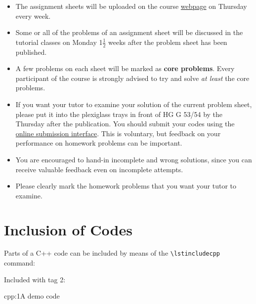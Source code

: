 \documentclass[12pt]{report}
\begin{document}
\begin{itemize}
\item The assignment sheets will be uploaded on the course
  \href{http://www2.math.ethz.ch/education/bachelor/lectures/hs2015/math/nummath_cse/index}{webpage}
  on Thursday every week.
\item Some or all of the problems of an assignment sheet will be discussed in the
  tutorial classes on Monday 1$\frac{1}{2}$ weeks after the problem sheet has been
  published.
\item A few problems on each sheet will be marked as {\bf core problems}. 
  Every participant of the course is strongly advised to try and solve \emph{at least}
  the core problems. 
\item If you want your tutor to examine your solution of the current problem
  sheet, please put it into the plexiglass trays in front of HG G 53/54 by the
  Thursday after the publication. You should submit your codes using the
  \href{https://people.math.ethz.ch/~grsam/submit/}{online submission
    interface}. This is voluntary, but feedback on your performance on homework
  problems can be important.
\item You are encouraged to hand-in incomplete and wrong solutions, since 
  you can receive valuable feedback even on incomplete attempts.
\item Please clearly mark the homework problems that you want your tutor to
  examine.
\end{itemize}


%
%




%

\section{Inclusion of Codes}

Parts of a C++ code can be included by means of the \verb|\lstincludecpp| command:

Included with tag 2:

\begin{samcode}[C++ code]{cpp:1}{A demo code}
\end{samcode}
\end{document}
